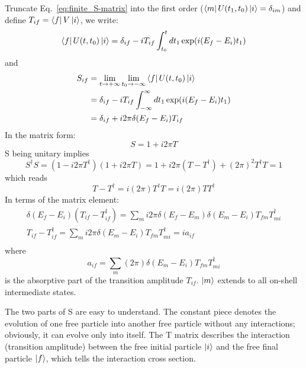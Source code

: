 Truncate Eq.~\ref{eq:finite_S-matrix} into the first order ($\bra{m} U(t_1, t_0) \ket{i} = \delta_{im}$)
and define $T_{if} = \bra{f} V \ket{i}$, we write:
\begin{equation}
    \bra{f} U(t, t_0) \ket{i} = \delta_{if} - iT_{if} \int_{t_0}^t dt_1 \exp(i(E_f - E_i)t_1)
\end{equation}
and 
\begin{equation}
    \begin{aligned}
	S_{if} &= \lim_{t\rightarrow +\infty}\lim_{t_0 \rightarrow -\infty} \bra{f} U(t, t_0) \ket{i}    \\
	    &= \delta_{if} - iT_{if} \int_{-\infty}^{\infty} dt_1 \exp(i(E_f - E_i)t_1)	\\
	    &= \delta_{if} + i2\pi\delta(E_f - E_i)T_{if}   \\
    \end{aligned}
\end{equation}
In the matrix form:
\begin{equation}
    S = 1 + i2\pi T
\end{equation}
S being unitary implies
\begin{equation}
    S^\dag S = (1 - i2\pi T^\dag) (1 + i2\pi T) = 1 + i2\pi(T - T^\dag) + (2\pi)^2 T^\dag T = 1
\end{equation}
which reads
\begin{equation}
    T - T^\dag = i (2\pi)T^\dag T = i(2\pi) T T^\dag
\end{equation}
In terms of the matrix element:
\begin{equation}
    \begin{gathered}
    \delta(E_f - E_i)(T_{if} - T^\dag_{if}) = \sum_m i2\pi\delta(E_f - E_m)\delta(E_m - E_i)T_{fm}T^\dag_{mi}	\\
    T_{if} - T^\dag_{if} = \sum_m i2\pi\delta(E_m - E_i)T_{fm}T^\dag_{mi} = ia_{if} \\
    \end{gathered}
\end{equation}
where 
\begin{equation}
    a_{if} = \sum_m (2\pi) \delta(E_m - E_i)T_{fm}T^\dag_{mi}
\end{equation}
is the absorptive part of the transition amplitude $T_{if}$. $\ket{m}$ extends
to all on-shell intermediate states.

The two parts of S are easy to understand.
The constant piece denotes the evolution of one free particle into another free
particle without any interactions; obviously, it can evolve only into itself.
The T matrix describes the interaction (transition amplitude) between the free
initial particle $\ket{i}$ and the free final particle $\ket{f}$, which tells
the interaction cross section.

